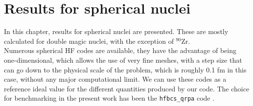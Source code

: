 \chapter{Results for spherical nuclei}
In this chapter, results for spherical nuclei are presented. These are mostly calculated for double magic nuclei, with the exception of $^{90}$Zr.
\\Numerous spherical HF codes are available, they have the advantage of being one-dimensional, which allows the use of very fine meshes, with a step size that can go down to the physical scale of the problem, which is roughly 0.1 fm in this case, without any major computational limit. We can use these codes as a reference ideal value for the different quantities produced by our code. The choice for benchmarking in the present work has been the \texttt{hfbcs\_qrpa} code \cite{hfbcsqrpa}.

